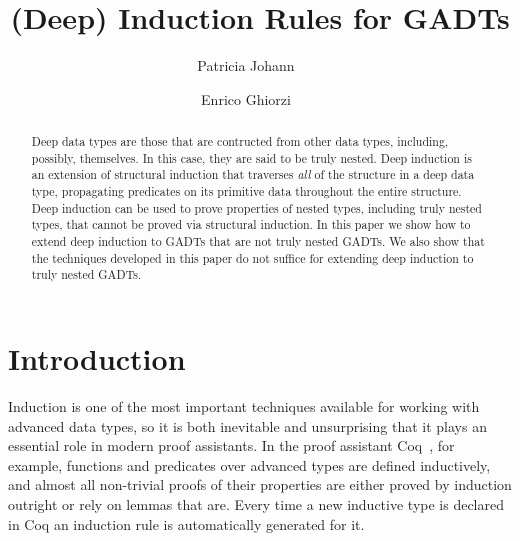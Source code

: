 \documentclass[9pt]{entcs}
\begin{document}
\begin{frontmatter}
  \vspace*{-0.1in}
  \title{(Deep) Induction Rules for GADTs\vspace*{-0.1in}}
  \author{Patricia Johann~~~~}%
  \author{Enrico Ghiorzi~~~~}%
  \address{$\mathtt{\{johannp,ghiorzie\}@appstate.edu}$\\
    Appalachian State University}

\vspace*{-0.1in}

\begin{abstract} 
  Deep data types are those that are contructed from other data types,
  including, possibly, themselves.  In this case, they are said to be
  truly nested.  Deep induction is an extension of structural
  induction that traverses {\em all} of the structure in a deep data
  type, propagating predicates on its primitive data throughout the
  entire structure.  Deep induction can be used to prove properties of
  nested types, including truly nested types, that cannot be proved
  via structural induction.  In this paper we show how to extend deep
  induction to GADTs that are not truly nested GADTs. We also show
  that the techniques developed in this paper do not suffice for
  extending deep induction to truly nested GADTs.
\end{abstract}

\end{frontmatter}

\vspace*{-0.1in}

\section{Introduction}\label{sec:intro}

Induction is one of the most important techniques available for
working with advanced data types, so it is both inevitable and
unsurprising that it plays an essential role in modern proof
assistants. In the proof assistant Coq~\cite{coq20}, for example,
functions and predicates over advanced types are defined inductively,
and almost all non-trivial proofs of their properties are either
proved by induction outright or rely on lemmas that are.  Every time a
new inductive type is declared in Coq an induction rule is
automatically generated for it.
\end{document}
